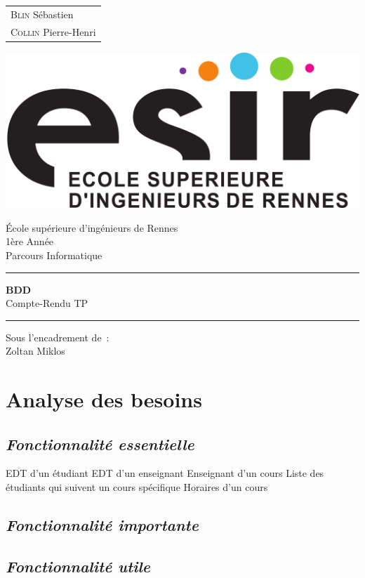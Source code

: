 \documentclass{article}
\begin{document}
\begin{titlepage}
	\vspace{-20px}
	\begin{tabular}{l}
		\textsc{Blin} S\'ebastien\\
		\textsc{Collin} Pierre-Henri
	\end{tabular}
	\hfill \vspace{10px}\includegraphics[scale=0.1]{esir.png}\\
	\vfill
	\begin{center}
		\Huge{\'Ecole sup\'erieure d'ing\'enieurs de Rennes}\\
		\vspace{1cm}
		\LARGE{1\`ere Ann\'ee}\\
		\large{Parcours Informatique}\\
		\vspace{0.5cm}\hrule\vspace{0.5cm}
		\LARGE{\textbf{BDD}}\\
		\Large{Compte-Rendu TP }
		\vspace{0.5cm}\hrule
		\vfill
		\vfill
	\end{center}
	\begin{flushleft}
		\Large{Sous l'encadrement de~:}\\
		\vspace{0.2cm}
		\large{{Zoltan} Miklos}
	\end{flushleft}
	\vfill
\end{titlepage}
\section{Analyse des besoins}
\subsection{\textit{Fonctionnalit\'e essentielle}}
EDT d'un étudiant
EDT d'un enseignant
Enseignant d'un cours
Liste des étudiants qui suivent un cours spécifique
Horaires d'un cours
\subsection{\textit{Fonctionnalit\'e importante}}
\subsection{\textit{Fonctionnalit\'e utile}}
\end{document}
